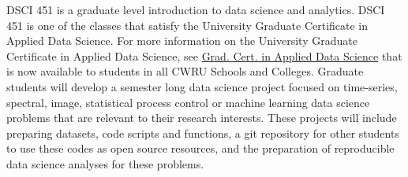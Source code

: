 \documentclass[10pt]{article} %
\begin{document}
    DSCI 451 is a graduate level introduction to data science and analytics.
    DSCI 451 is one of the classes that satisfy the University Graduate Certificate in Applied Data Science.
    For more information on the University Graduate Certificate in Applied Data Science, see  \href{https://bulletin.case.edu/engineering/materials-science-engineering/applied-data-science-graduate-certificate/}{Grad. Cert. in Applied Data Science} that is now available to students in all CWRU Schools and Colleges.
    Graduate students will develop a semester long data science project focused on time-series, spectral, image, statistical process control or machine learning data science problems that are relevant to their research interests.
    These projects will include preparing datasets, code scripts and functions, a git repository for other students to use these codes as open source resources, and the preparation of reproducible data science analyses for these problems.
\end{document}
